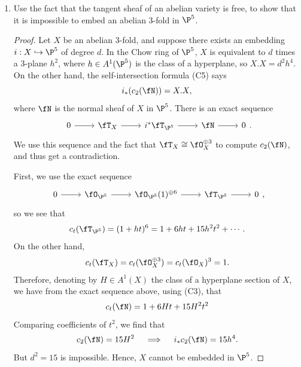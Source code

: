 \documentclass[a4paper]{article}
\begin{document}
\begin{enumerate} [label=\textbf{\arabic*.}, leftmargin=0em]
      \item Use the fact that the tangent sheaf of an abelian variety is free, to show that it is impossible to embed an abelian 3-fold in $\P^5$.

      \begin{proof}
            Let $X$ be an abelian 3-fold, and suppose there exists an embedding $i : X \hookrightarrow \P^5$ of degree $d$.
            In the Chow ring of $\P^5$, $X$ is equivalent to $d$ times a 3-plane $h^2$, where $h \in A^1(\P^5)$ is the class of a hyperplane, so $X.X = d^2h^4$.
            On the other hand, the self-intersection formula (C5) says
            \begin{equation*}
                  i_*(c_2(\fN)) = X.X,
            \end{equation*}
            where $\fN$ is the normal sheaf of $X$ in $\P^5$.
            There is an exact sequence
            \[ \begin{tikzcd}
                  0 \arrow[r] & \fT_X \arrow[r] & i^* \fT_{\P^5} \arrow[r] & \fN \arrow[r] & 0
            \end{tikzcd} . \]
            We use this sequence and the fact that $\fT_X \cong \fO_X^{\oplus 3}$ to compute $c_2(\fN)$, and thus get a contradiction.

            First, we use the exact sequence
            \[ \begin{tikzcd}
                  0 \arrow[r] & \fO_{\P^5} \arrow[r] & \fO_{\P^5}(1)^{\oplus 6} \arrow[r] & \fT_{\P^5} \arrow[r] & 0
            \end{tikzcd} , \]
            so we see that
            \begin{equation*}
                  c_t(\fT_{\P^5}) = (1 + ht)^6 = 1 + 6ht + 15h^2t^2 + \cdots.
            \end{equation*}
            On the other hand,
            \begin{equation*}
                  c_t(\fT_X) = c_t(\fO_X^{\oplus 3}) = c_t(\fO_X)^3 = 1.
            \end{equation*}
            Therefore, denoting by $H \in A^1(X)$ the class of a hyperplane section of $X$, we have from the exact sequence above, using (C3), that
            \begin{equation*}
                  c_t(\fN) = 1 + 6Ht + 15H^2t^2
            \end{equation*}
            Comparing coefficients of $t^2$, we find that
            \begin{equation*}
                  c_2(\fN) = 15H^2 \quad \implies \quad i_* c_2(\fN) = 15 h^4.
            \end{equation*}
            But $d^2 = 15$ is impossible.
            Hence, $X$ cannot be embedded in $\P^5$.
      \end{proof}

\end{enumerate}
\end{document}
